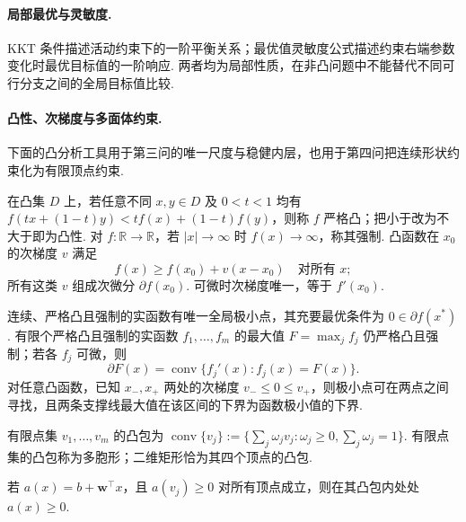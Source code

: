 \paragraph{局部最优与灵敏度. \quad}
KKT 条件描述活动约束下的一阶平衡关系；最优值灵敏度公式描述约束右端参数变化时最优目标值的一阶响应. 两者均为局部性质，在非凸问题中不能替代不同可行分支之间的全局目标值比较. 


\paragraph{凸性、次梯度与多面体约束. \quad}
下面的凸分析工具用于第三问的唯一尺度与稳健内层，也用于第四问把连续形状约束化为有限顶点约束. 

\begin{definition}\label{def:bg-convex-v26}
在凸集 $D$ 上，若任意不同 $x,y\in D$ 及 $0<t<1$ 均有
$f(tx+(1-t)y)<tf(x)+(1-t)f(y)$，则称 $f$ 严格凸；把小于改为不大于即为凸性. 对 $f:\mathbb R\to\mathbb R$，若 $|x|\to\infty$ 时 $f(x)\to\infty$，称其强制. 凸函数在 $x_0$ 的次梯度 $v$ 满足
\[
f(x)\ge f(x_0)+v(x-x_0)\quad\text{对所有 }x;
\]
所有这类 $v$ 组成次微分 $\partial f(x_0)$. 可微时次梯度唯一，等于 $f'(x_0)$. 
\end{definition}

\begin{proposition}\label{prop:bg-convex-minimum-v26}
连续、严格凸且强制的实函数有唯一全局极小点，其充要最优条件为 $0\in\partial f(x^*)$. 有限个严格凸且强制的实函数 $f_1,\ldots,f_m$ 的最大值 $F=\max_jf_j$ 仍严格凸且强制；若各 $f_j$ 可微，则
\[
\partial F(x)=\operatorname{conv}\{f_j'(x):f_j(x)=F(x)\}.
\]
对任意凸函数，已知 $x_-, x_+$ 两处的次梯度 $v_-\le0\le v_+$，则极小点可在两点之间寻找，且两条支撑线最大值在该区间的下界为函数极小值的下界. 
\end{proposition}


\begin{definition}[凸包与顶点表示]\label{def:bg-polytope-v26}
有限点集 $v_1,\ldots,v_m$ 的凸包为
$\operatorname{conv}\{v_j\}:=\{\sum_j\omega_jv_j:\omega_j\ge0,\sum_j\omega_j=1\}$. 
有限点集的凸包称为多胞形；二维矩形恰为其四个顶点的凸包. 
\end{definition}
\begin{proposition}[仿射不等式的顶点检验]\label{prop:bg-affine-vertices-v26}
若 $a(x)=b+\boldsymbol w^\top x$，且 $a(v_j)\ge0$ 对所有顶点成立，则在其凸包内处处 $a(x)\ge0$. 
\end{proposition}


